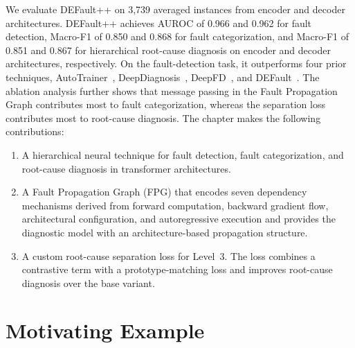 We evaluate DEFault++ on 3{,}739 averaged instances from encoder and decoder architectures. DEFault++ achieves AUROC of 0.966 and 0.962 for fault detection, Macro-F1 of 0.850 and 0.868 for fault categorization, and Macro-F1 of 0.851 and 0.867 for hierarchical root-cause diagnosis on encoder and decoder architectures, respectively. On the fault-detection task, it outperforms four prior techniques, AutoTrainer~\cite{autotrainer}, DeepDiagnosis~\cite{deepdiagnosis}, DeepFD~\cite{deepfd}, and DEFault~\cite{default}. The ablation analysis further shows that message passing in the Fault Propagation Graph contributes most to fault categorization, whereas the separation loss contributes most to root-cause diagnosis. The chapter makes the following contributions:

\begin{enumerate}[label=(\alph*)]
\item A hierarchical neural technique for fault detection, fault categorization, and root-cause diagnosis in transformer architectures.

\item A Fault Propagation Graph (FPG) that encodes seven dependency mechanisms derived from forward computation, backward gradient flow, architectural configuration, and autoregressive execution and provides the diagnostic model with an architecture-based propagation structure.

\item A custom root-cause separation loss for Level~3. The loss combines a contrastive term with a prototype-matching loss and improves root-cause diagnosis over the base variant.
\end{enumerate}

\section{Motivating Example}
\label{sec:defaultpp_motivation}

\begin{listing}[!htbp]
\caption{Faulty QKV projection fusion from HuggingFace Diffusers Issue \#11903 (simplified).}
\label{lst:qkv_fusion_bug}
\end{listing}

